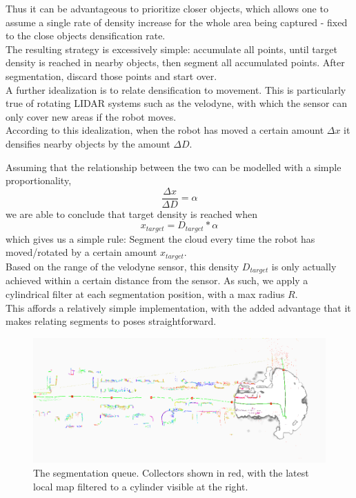 Thus it can be advantageous to prioritize closer objects, which allows one to assume a single rate of density increase for the whole area being captured - fixed to the close objects densification rate.\\

The resulting strategy is excessively simple: accumulate all points, until target density is reached in nearby objects, then segment all accumulated points. After segmentation, discard those points and start over.\\

A further idealization is to relate densification to movement. This is particularly true of rotating LIDAR systems such as the velodyne, with which the sensor can only cover new areas if the robot moves.\\

According to this idealization, when the robot has moved a certain amount $\Delta x$ it densifies nearby objects by the amount $\Delta D$.

Assuming that the relationship between the two can be modelled with a simple proportionality,
$$\frac{\Delta x}{\Delta D} = \alpha$$
we are able to conclude that target density is reached when
$$x_{target} = D_{target} * \alpha$$
which gives us a simple rule: Segment the cloud every time the robot has moved/rotated by a certain amount $x_{target}$.\\

Based on the range of the velodyne sensor, this density $D_{target}$ is only actually achieved within a certain distance from the sensor. As such, we apply a cylindrical filter at each segmentation position, with a max radius $R$.\\

This affords a relatively simple implementation, with the added advantage that it makes relating segments to poses straightforward.\\



\begin{figure}
  \centering
  \includegraphics[width=5.2in]{images/seg_queue.png}
  \caption{The segmentation queue. Collectors shown in red, with the latest local map filtered to a cylinder visible at the right.}
  \label{fig:seg-queue}
\end{figure}


